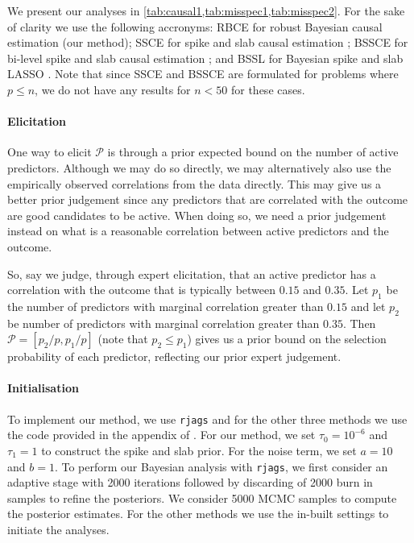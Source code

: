 \documentclass[preprint,12pt]{elsarticle}
\begin{document}
We present our analyses in \cref{tab:causal1,tab:misspec1,tab:misspec2}.
For the sake of clarity we use the following accronyms: RBCE for 
robust Bayesian causal estimation (our method); SSCE for spike and
slab causal estimation \citep{koch2020}; BSSCE for bi-level spike and slab causal
estimation \citep{koch2020}; and BSSL for Bayesian spike and slab LASSO
\citep{xu2015}. Note that since SSCE and BSSCE are formulated for problems
where $p\le n$, we do not have any results for $n<50$ for these cases.

\paragraph{Elicitation}
One way to elicit $\mathcal{P}$
is through a prior expected bound on the number of active predictors.
Although we may do so directly,
we may alternatively also use the empirically observed correlations from the data directly.
This may give us a better prior judgement since any predictors that are correlated with the outcome are good candidates to be active.
When doing so, we need a prior judgement instead on what is a reasonable correlation between active predictors and the outcome.

So, say we judge, through expert elicitation, that
an active predictor has a correlation with the outcome
that is typically between $0.15$ and $0.35$.
Let $p_1$ be the number of predictors with marginal correlation greater than $0.15$
and let $p_2$ be number of predictors with marginal 
correlation greater than $0.35$.
Then $\mathcal{P}=[p_2/p , p_1/p]$ (note that $p_2\le p_1$) gives us a prior bound on the selection probability of each predictor, reflecting our prior expert judgement.

\paragraph{Initialisation} 
To implement our method, we use \texttt{rjags} and for the other three
methods we use the code provided in the appendix of \citep{koch2020}.
For our method, we set $\tau_0=10^{-6}$ and $\tau_1=1$ to construct the
spike and slab prior.
For the noise term, we set $a=10$ and $b=1$.
To perform 
our Bayesian analysis with \texttt{rjags}, we first consider an adaptive 
stage with 2000 iterations followed by discarding of 2000 burn in samples 
to refine the posteriors. We consider 5000 MCMC samples to compute the
posterior estimates. For the other methods we use the in-built settings 
to initiate the analyses.
\end{document}
